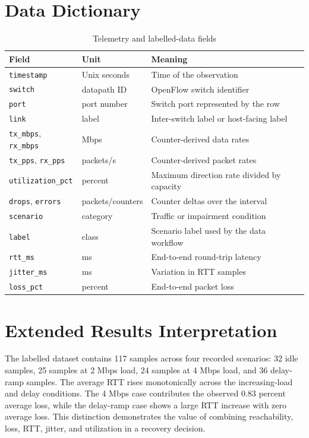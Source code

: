 \documentclass[conference]{IEEEtran}
\begin{document}
\section{Data Dictionary}
\label{app:data}

\begin{table}[t]
\centering
\caption{Telemetry and labelled-data fields}
\label{tab:data}
\begin{tabular}{p{}p{}p{}}
\toprule
Field & Unit & Meaning\\
\midrule
\texttt{timestamp} & Unix seconds & Time of the observation\\
\texttt{switch} & datapath ID & OpenFlow switch identifier\\
\texttt{port} & port number & Switch port represented by the row\\
\texttt{link} & label & Inter-switch label or host-facing label\\
\texttt{tx\_mbps}, \texttt{rx\_mbps} & Mbps & Counter-derived data rates\\
\texttt{tx\_pps}, \texttt{rx\_pps} & packets/s & Counter-derived packet rates\\
\texttt{utilization\_pct} & percent & Maximum direction rate divided by capacity\\
\texttt{drops}, \texttt{errors} & packets/counters & Counter deltas over the interval\\
\texttt{scenario} & category & Traffic or impairment condition\\
\texttt{label} & class & Scenario label used by the data workflow\\
\texttt{rtt\_ms} & ms & End-to-end round-trip latency\\
\texttt{jitter\_ms} & ms & Variation in RTT samples\\
\texttt{loss\_pct} & percent & End-to-end packet loss\\
\bottomrule
\end{tabular}
\end{table}

\section{Extended Results Interpretation}
\label{app:interpretation}

The labelled dataset contains 117 samples across four recorded scenarios:
32 idle samples, 25 samples at 2 Mbps load, 24 samples at 4 Mbps load, and
36 delay-ramp samples. The average RTT rises monotonically across the
increasing-load and delay conditions. The 4 Mbps case contributes the observed
0.83 percent average loss, while the delay-ramp case shows a large RTT
increase with zero average loss. This distinction demonstrates the value of
combining reachability, loss, RTT, jitter, and utilization in a recovery
decision.
\end{document}
